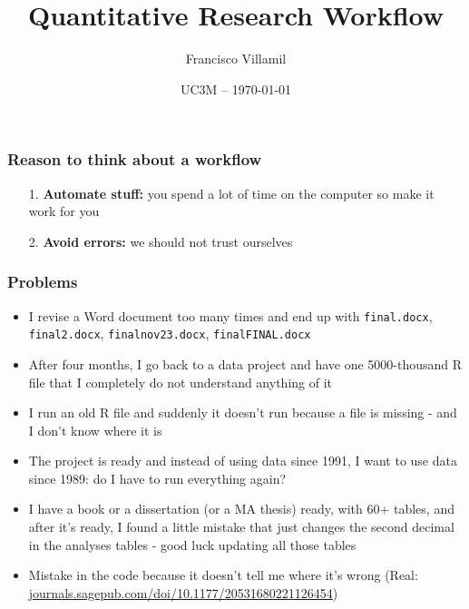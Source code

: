 \documentclass[aspectratio=43]{beamer}
\title[]{\huge Quantitative Research Workflow}
\author[]{Francisco Villamil}
\date[]{UC3M -- \today}
\begin{document}

\begin{frame}
  \titlepage
\end{frame}

\begin{frame}
\frametitle{Reason to think about a workflow}
\centering

\begin{itemize}
  \item[1.] \textbf{Automate stuff:} you spend a lot of time on the computer so make it work for you
  \item[2.] \textbf{Avoid errors:} we should not trust ourselves
\end{itemize}

\end{frame}

\begin{frame}
\frametitle{Problems}
\centering

\begin{itemize}[<+->] \small
{}
  \item I revise a Word document too many times and end up with \texttt{final.docx}, \texttt{final2.docx}, \texttt{finalnov23.docx}, \texttt{finalFINAL.docx}
  \item After four months, I go back to a data project and have one 5000-thousand R file that I completely do not understand anything of it
  \item I run an old R file and suddenly it doesn't run because a file is missing - and I don't know where it is
  \item The project is ready and instead of using data since 1991, I want to use data since 1989: do I have to run everything again?
  \item I have a book or a dissertation (or a MA thesis) ready, with 60+ tables, and after it's ready, I found a little mistake that just changes the second decimal in the analyses tables - good luck updating all those tables
  \item Mistake in the code because it doesn't tell me where it's wrong (Real: \href{https://journals.sagepub.com/doi/10.1177/20531680221126454}{journals.sagepub.com/doi/10.1177/20531680221126454})
\end{itemize}

\end{frame}
\end{document}
